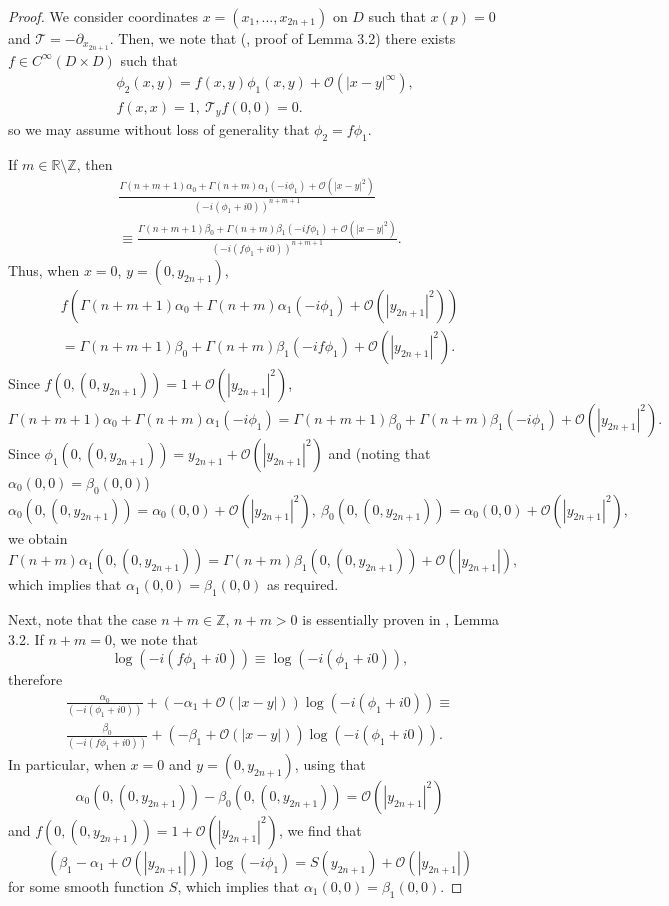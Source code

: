 \documentclass{article}
\newcommand{\RR}{\mathbb R}
\newcommand{\ZZ}{\mathbb Z}
\newcommand{\mct}{\mathcal T}
\newcommand{\mco}{\mathcal O}
\begin{document}
%
%
%
\begin{proof}
We consider coordinates $x = (x_1, ...,x_{2n+1})$ on $D$ such that $x(p) = 0$ and $\mct = -\partial_{x_{2n+1}}$.
Then, we note that (\cite{hsiao_shen}, proof of Lemma 3.2) there exists $f \in C^\infty(D \times D)$ such that $$\begin{aligned} &\phi_2(x,y) = f(x,y) \phi_1(x,y) + \mco(|x-y|^\infty),\\ &f(x,x) = 1,\ \mct_y f(0,0) = 0.\end{aligned}$$
so we may assume without loss of generality that $\phi_2 = f \phi_1$. 

If $m \in \RR \setminus \ZZ$, then \begin{multline*}\frac{\Gamma(n+m+1) \alpha_0 + \Gamma(n+m)\alpha_1(-i\phi_1) + \mco(|x-y|^2)}{(-i(\phi_1 + i0))^{n+m+1}} \\ \equiv \frac{\Gamma(n+m+1) \beta_0 + \Gamma(n+m)\beta_1(-if\phi_1) + \mco(|x-y|^2)}{(-i(f\phi_1 + i0))^{n+m+1}}.\end{multline*}
Thus, when $x = 0$, $y = (0, y_{2n+1})$, \begin{multline*}f(\Gamma(n+m+1) \alpha_0+\Gamma(n+m) \alpha_1(-i\phi_1) + \mco(|y_{2n+1}|^2)) \\= \Gamma(n+m+1) \beta_0 + \Gamma(n+m) \beta_1(-i f \phi_1)+\mco(|y_{2n+1}|^2).\end{multline*}
Since $f(0,(0,y_{2n+1})) = 1 + \mco(|y_{2n+1}|^2)$,$$\Gamma(n+m+1) \alpha_0 + \Gamma(n+m) \alpha_1(-i\phi_1) = \Gamma(n+m+1) \beta_0 +\Gamma(n+m) \beta_1 (-i \phi_1) + \mco(|y_{2n+1}|^2).$$
Since $\phi_1(0,(0,y_{2n+1})) = y_{2n+1} + \mco(|y_{2n+1}|^2)$ and (noting that $\alpha_0(0,0) = \beta_0(0,0)$) $$\alpha_0(0,(0,y_{2n+1})) = \alpha_0(0,0) + \mco(|y_{2n+1}|^2),\ \beta_0(0,(0,y_{2n+1})) = \alpha_0(0,0) + \mco(|y_{2n+1}|^2),$$
we obtain $$\Gamma(n+m)\alpha_1(0,(0,y_{2n+1})) =\Gamma(n+m) \beta_1(0,(0,y_{2n+1})) + \mco(|y_{2n+1}|),$$
which implies that $\alpha_1(0,0) = \beta_1(0,0)$ as required.

Next, note that the case $n+m \in \ZZ$, $n +m > 0$ is essentially proven in \cite{hsiao_shen}, Lemma 3.2. If $n+m = 0$, we note that $$\log(-i(f \phi_1 + i0)) \equiv \log(-i(\phi_1 + i 0)),$$ therefore \begin{multline*}\frac{\alpha_0}{(-i (\phi_1 + i0))} + (-\alpha_1 + \mco(|x-y|)) \log(-i(\phi_1+i0)) \equiv\\ \frac{\beta_0}{(-i(f \phi_1+i0))} +(-\beta_1 + \mco(|x-y|))\log(-i(\phi_1 + i0)).\end{multline*}
In particular, when $x = 0$ and $y = (0, y_{2n+1})$, using that $$\alpha_0(0,(0,y_{2n+1})) - \beta_0(0,(0,y_{2n+1})) = \mco(|y_{2n+1}|^2)$$ and $f(0,(0,y_{2n+1})) = 1+\mco(|y_{2n+1}|^2)$, we find that $$(\beta_1-\alpha_1 + \mco(|y_{2n+1}|))\log(-i \phi_1) = S(y_{2n+1})+\mco(|y_{2n+1}|)$$
for some smooth function $S$, which implies that $\alpha_1(0,0) = \beta_1(0,0)$.


\end{proof}
\end{document}
